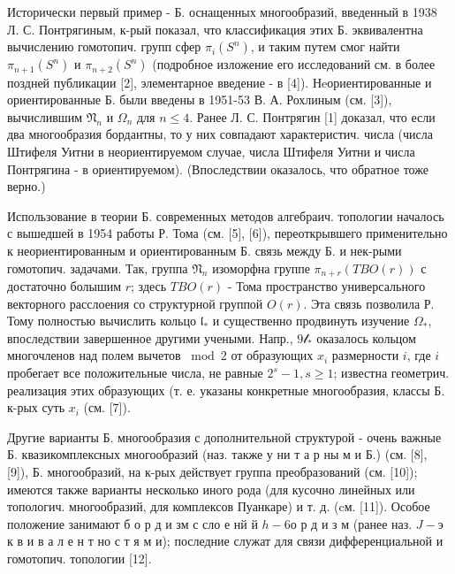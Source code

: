 \documentclass[10pt]{article}
\begin{document}
Исторически первый пример - Б. оснащенных многообразий, введенный в 1938 Л. С. Понтрягиным, к-рый показал, что классификация этих Б. эквивалентна вычислению гомотопич. групп сфер $\pi_{i}\left(S^{n}\right)$, и таким путем смог найти $\pi_{n+1}\left(S^{n}\right)$ и $\pi_{n+2}\left(S^{n}\right)$ (подробное изложение его исследований см. в более поздней публикации [2], элементарное введение - в [4]). Нeориентированные и ориентированные Б. были введены в 1951-53 В. А. Рохлиным (см. [3]), вычислившим $\mathfrak{N}_{n}$ и $\Omega_{n}$ для $n \leqslant 4$. Ранее Л. С. Понтрягин [1] доказал, что если два многообразия бордантны, то у них совпадают характеристич. числа (числа Штифеля Уитни в неориентируемом случае, числа Штифеля Уитни и числа Понтрягина - в ориентируемом). (Впоследствии оказалось, что обратное тоже верно.)



Использование в теории Б. современных методов алгебраич. топологии началось с вышедшей в 1954 работы Р. Тома (см. [5], [6]), переоткрывшего применительно к неориентированным и ориентированным Б. связь между Б. и нек-рыми гомотопич. задачами. Так, группа $\mathfrak{N}_{n}$ изоморфна группе $\pi_{n+r}(T B O(r))$ с достаточно болышим $r$; здесь $T B O(r)$ - Тома пространство универсального векторного расслоения со структурной группой $O(r)$. Эта связь позволила Р. Тому полностью вычислить кольцо $\mathfrak{l}_{*}$ и существенно продвинуть изучение $\Omega_{*}$, впоследствии завершенное другими учеными. Напр., $9 \mathcal{l}_{*}$ оказалось кольцом многочленов над полем вычетов $\bmod 2$ от образующих $x_{i}$ размерности $i$, где $i$ пробегает все положительные числа, не равные $2^{s}-1, s \geqslant 1$; известна геометрич. реализация этих образующих (т. е. указаны конкретные многообразия, классы Б. к-рых суть $x_{i}$ (см. [7]).



Другие варианты Б. многообразия с дополнительной структурой - очень важные Б. квазикомплексных многообразий (наз. также у ни т а р ны м и Б.) (см. [8], [9]), Б. многообразий, на к-рых действует группа преобразований (см. [10]); имеются также варианты несколько иного рода (для кусочно линейных или топологич. многообразий, для комплексов Пуанкаре) и т. д. (cм. [11]). Особое положение занимают б о р д и зм с сло е нй й $h-6 о$ р д и з м (ранее наз. $J-э$ к в и в а л е н т но с т я м и); последние служат для связи дифференциальной и гомотопич. топологии [12].
\end{document}
